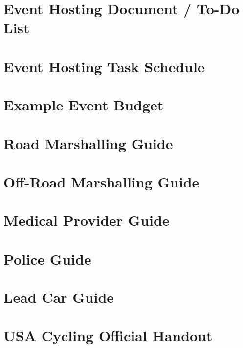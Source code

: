 \documentclass[
  letterpaper, %
  fontsize=10pt, %
  twoside=true,
  chapterentrydots=true, %
  numbers=noenddot,
  fontmethod=tex,
]{kaobook}
\begin{document}
\appendix


\setchapterpreamble[u]{\margintoc}
\chapter{Event Hosting Document / To-Do List}

\setchapterpreamble[u]{\margintoc}
\chapter{Event Hosting Task Schedule}

\setchapterpreamble[u]{\margintoc}
\chapter{Example Event Budget}

\setchapterpreamble[u]{\margintoc}
\chapter{Road Marshalling Guide}

\setchapterpreamble[u]{\margintoc}
\chapter{Off-Road Marshalling Guide}

\setchapterpreamble[u]{\margintoc}
\chapter{Medical Provider Guide}

\setchapterpreamble[u]{\margintoc}
\chapter{Police Guide}

\setchapterpreamble[u]{\margintoc}
\chapter{Lead Car Guide}


\setchapterpreamble[u]{\margintoc}
\chapter{USA Cycling Official Handout}

\backmatter
{}


\printindex

\end{document}
